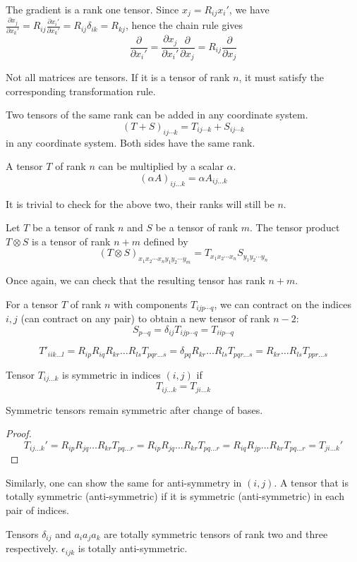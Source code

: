\documentclass[a4paper]{article}
\begin{document}
\begin{eg}
The gradient is a rank one tensor. Since $x_j=R_{ij}x_i'$, we have $\frac{\partial x_j}{\partial x_k'}=R_{ij}\frac{\partial x_i'}{\partial x_k'}=R_{ij}\delta_{ik}=R_{kj}$, hence the chain rule gives
$$\frac{\partial}{\partial x_i'}=\frac{\partial x_j}{\partial x_i'}\frac{\partial}{\partial x_j}=R_{ij}\frac{\partial}{\partial x_j}$$
\end{eg}
\begin{remarks}
Not all matrices are tensors. If it is a tensor of rank $n$, it must satisfy the corresponding transformation rule.
\end{remarks}
\begin{defi}
  Two tensors of the same rank can be added in any coordinate system.
  $$(T + S)_{ij\cdots k} = T_{ij \cdots k} + S_{ij\cdots k}$$
  in any coordinate system. Both sides have the same rank.
\end{defi}
\begin{defi}
  A tensor $T$ of rank $n$ can be multiplied by a scalar $\alpha$. 
  $$(\alpha A)_{ij\dots k}=\alpha A_{ij\dots k}$$
\end{defi}
It is trivial to check for the above two, their ranks will still be $n$.
\begin{defi}
  Let $T$ be a tensor of rank $n$ and $S$ be a tensor of rank $m$. The tensor product $T\otimes S$ is a tensor of rank $n + m$ defined by
 $$(T \otimes S)_{x_1 x_2\cdots x_n y_1y_2\cdots y_m} = T_{x_1x_2\cdots x_n}S_{y_1y_2\cdots y_n}$$
\end{defi}
Once again, we can check that the resulting tensor has rank $n+m$.
\begin{defi}
  For a tensor $T$ of rank $n$ with components $T_{ijp\cdots q}$, we can contract on the indices $i, j$ (can contract on any pair) to obtain a new tensor of rank $n - 2$:
  $$S_{p\cdots q} = \delta_{ij}T_{ij p\cdots q} = T_{iip\cdots q}$$
\end{defi}
$$T'_{iik\dots l}=R_{ip}R_{iq}R_{kr}\dots R_{ls}T_{pqr\dots s}=\delta_{pq}R_{kr}\dots R_{ls}T_{pqr\dots s}=R_{kr}\dots R_{ls}T_{ppr\dots s}$$
\begin{defi}[Symmetric]
Tensor $T_{ij\dots k}$ is symmetric in indices $(i,j)$ if
$$T_{ij\dots k}=T_{ji\dots k}$$
\end{defi}
\begin{prop}
Symmetric tensors remain symmetric after change of bases.
\end{prop}
\begin{proof}
$$T_{ij\dots k}'=R_{ip}R_{jq}\dots R_{kr}T_{pq\dots r}=R_{ip}R_{jq}\dots R_{kr}T_{pq\dots r}=R_{iq}R_{jp}\dots R_{kr}T_{pq\dots r}=T_{ji\dots k}'$$
\end{proof}
Similarly, one can show the same for anti-symmetry in $(i,j)$. A tensor that is totally symmetric (anti-symmetric) if it is symmetric (anti-symmetric) in each pair of indices.
\begin{eg}
Tensors $\delta_{ij}$ and $a_ia_ja_k$ are totally symmetric tensors of rank two and three respectively. $\epsilon_{ijk}$ is totally anti-symmetric.
\end{eg}
\end{document}
